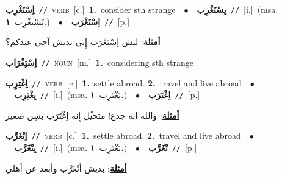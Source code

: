 \documentclass[10pt,a4paper,twoside]{article} %
\begin{document}
\begin{multicols}{2}
{{{{{{{\setlength\topsep{0pt}\textbf{\foreignlanguage{arabic}{اِسْتَغْرِب}}\ {\color{gray}\texttt{//}\color{black}}\ \textsc{verb}\ [c.]\ \textbf{1.}~consider sth strange\ \ $\bullet$\ \ \setlength\topsep{0pt}\textbf{\foreignlanguage{arabic}{يِسْتَغْرِب}}\ {\color{gray}\texttt{//}\color{black}}\ [i.]\ \color{gray}(msa. \foreignlanguage{arabic}{يَسْتغْرِب}~\foreignlanguage{arabic}{\textbf{١.}})\color{black}\ \ $\bullet$\ \ \setlength\topsep{0pt}\textbf{\foreignlanguage{arabic}{اِسْتَغْرَب}}\ {\color{gray}\texttt{//}\color{black}}\ [p.]\  \begin{flushright}\color{gray}\foreignlanguage{arabic}{\textbf{\underline{\foreignlanguage{arabic}{أمثلة}}}: ليش اِسْتَغْرَب إِني بديش آجي عندكم؟}\end{flushright}\color{black}} \vspace{2mm}

{\setlength\topsep{0pt}\textbf{\foreignlanguage{arabic}{اِسْتِغْرَاب}}\ {\color{gray}\texttt{//}\color{black}}\ \textsc{noun}\ [m.]\ \textbf{1.}~considering sth strange\ 

{\setlength\topsep{0pt}\textbf{\foreignlanguage{arabic}{اِغْتِرِب}}\ {\color{gray}\texttt{//}\color{black}}\ \textsc{verb}\ [c.]\ \textbf{1.}~settle abroad.  \textbf{2.}~travel and live abroad\ \ $\bullet$\ \ \setlength\topsep{0pt}\textbf{\foreignlanguage{arabic}{يِغْتِرِب}}\ {\color{gray}\texttt{//}\color{black}}\ [i.]\ \color{gray}(msa. \foreignlanguage{arabic}{يَغْتَرِب}~\foreignlanguage{arabic}{\textbf{١.}})\color{black}\ \ $\bullet$\ \ \setlength\topsep{0pt}\textbf{\foreignlanguage{arabic}{اِغْتَرَب}}\ {\color{gray}\texttt{//}\color{black}}\ [p.]\  \begin{flushright}\color{gray}\foreignlanguage{arabic}{\textbf{\underline{\foreignlanguage{arabic}{أمثلة}}}: والله انه جدع! متخيِّل إِنه اِغْتَرَب بسِن صغير}\end{flushright}\color{black}} \vspace{2mm}

{\setlength\topsep{0pt}\textbf{\foreignlanguage{arabic}{اِتْغَرَّب}}\ {\color{gray}\texttt{//}\color{black}}\ \textsc{verb}\ [c.]\ \textbf{1.}~settle abroad.  \textbf{2.}~travel and live abroad\ \ $\bullet$\ \ \setlength\topsep{0pt}\textbf{\foreignlanguage{arabic}{يِتْغَرَّب}}\ {\color{gray}\texttt{//}\color{black}}\ [i.]\ \color{gray}(msa. \foreignlanguage{arabic}{يَغْتَرِب}~\foreignlanguage{arabic}{\textbf{١.}})\color{black}\ \ $\bullet$\ \ \setlength\topsep{0pt}\textbf{\foreignlanguage{arabic}{تْغَرَّب}}\ {\color{gray}\texttt{//}\color{black}}\ [p.]\  \begin{flushright}\color{gray}\foreignlanguage{arabic}{\textbf{\underline{\foreignlanguage{arabic}{أمثلة}}}: بديش أتْغَرَّب وأبعد عن أهلي}\end{flushright}\color{black}} \vspace{2mm}

}}}}}}}
\end{multicols}
\end{document}
